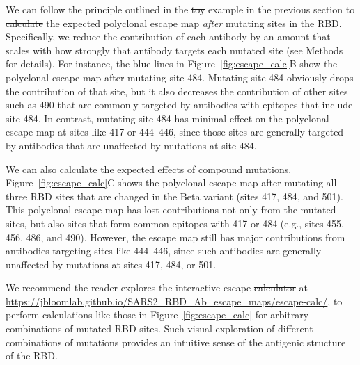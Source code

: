 \documentclass[9pt,twocolumn,twoside]{gsajnl_modified}
\providecommand{\DIFadd}[1]{{\protect\color{blue}\uwave{#1}}} %
\providecommand{\DIFdel}[1]{{\protect\color{red}\sout{#1}}}                      %
\providecommand{\DIFaddbegin}{} %
\providecommand{\DIFaddend}{} %
\providecommand{\DIFdelbegin}{} %
\providecommand{\DIFdelend}{} %
\begin{document}
We can follow the principle outlined in the \DIFdelbegin \DIFdel{toy }\DIFdelend \DIFaddbegin \DIFadd{illustrative }\DIFaddend example in the previous section to \DIFdelbegin \DIFdel{calculate }\DIFdelend \DIFaddbegin \DIFadd{estimate }\DIFaddend the expected polyclonal escape map \emph{after} mutating sites in the RBD.
Specifically, we reduce the contribution of each antibody by an amount that scales with how strongly that antibody targets each mutated site (see Methods for details).
For instance, the blue lines in Figure~\ref{fig:escape_calc}B show the polyclonal escape map after mutating site 484.
Mutating site 484 obviously drops the contribution of that site, but it also decreases the contribution of other sites such as 490 that are commonly targeted by antibodies with epitopes that include site 484.
In contrast, mutating site 484 has minimal effect on the polyclonal escape map at sites like 417 or 444--446, since those sites are generally targeted by antibodies that are unaffected by mutations at site 484.

We can also calculate the expected effects of compound mutations.
Figure~\ref{fig:escape_calc}C shows the polyclonal escape map after mutating all three RBD sites that are changed in the Beta variant (sites 417, 484, and 501).
This polyclonal escape map has lost contributions not only from the mutated sites, but also sites that form common epitopes with 417 or 484 (e.g., sites 455, 456, 486, and 490).
However, the escape map still has major contributions from antibodies targeting sites like 444--446, since such antibodies are generally unaffected by mutations at sites 417, 484, or 501.

We recommend the reader explores the interactive escape \DIFdelbegin \DIFdel{calculator }\DIFdelend \DIFaddbegin \DIFadd{estimator }\DIFaddend at \url{https://jbloomlab.github.io/SARS2_RBD_Ab_escape_maps/escape-calc/}, to perform calculations like those in Figure~\ref{fig:escape_calc} for arbitrary combinations of mutated RBD sites.
Such visual exploration of different combinations of mutations provides an intuitive sense of the antigenic structure of the RBD.
\end{document}
